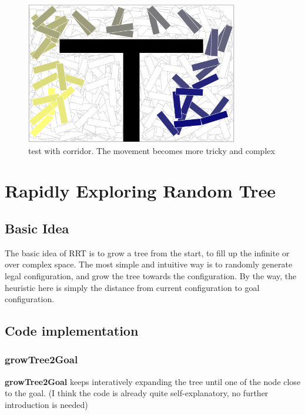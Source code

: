 \documentclass{article}
\begin{document}
\begin{figure}[!h]
\centering
\includegraphics[width=0.827\textwidth]{1-2.png}
\caption{test with corridor. The movement becomes more tricky and complex}
\label{1-2}
\end{figure}






\clearpage
\section{Rapidly Exploring Random Tree}
\subsection{Basic Idea}
The basic idea of RRT is to grow a tree from the start, to fill up the infinite or over complex space. The most simple and intuitive way is to randomly generate legal configuration, and grow the tree towards the configuration. By the way, the heuristic here is simply the distance from current configuration to goal configuration.





\subsection{Code implementation}


\subsubsection{growTree2Goal}

\textbf{growTree2Goal} keeps interatively expanding the tree until one of the node close to the goal. (I think the code is already quite self-explanatory, no further introduction is needed) 
\end{document}
